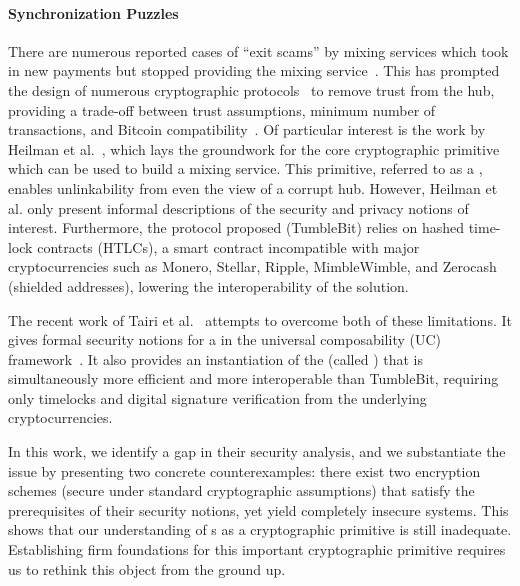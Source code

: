 \paragraph{Synchronization Puzzles} There are numerous reported cases of ``exit scams'' by mixing services which took in new payments but stopped providing the mixing service~\cite{exitscam}. 
This has prompted the design of numerous cryptographic protocols~\cite{FC:BNMCKF14,FCW:ValRow15,coinswap,FCW:HeiBalGol16} to remove trust from the hub, providing a trade-off between trust assumptions, minimum number of transactions, and Bitcoin compatibility~\cite{NDSS:HABSG17}. Of particular interest is the work by Heilman et al.~\cite{NDSS:HABSG17}, which lays the groundwork for the core cryptographic primitive which can be used to build a mixing service. This primitive, referred to as a \emph{\syncpuzzle}, enables unlinkability from even the view of a corrupt hub. However, Heilman et al. only present informal descriptions of the security and privacy notions of interest. Furthermore, the protocol proposed (TumbleBit) relies on hashed time-lock contracts (HTLCs), a smart contract incompatible with major cryptocurrencies such as Monero, Stellar, Ripple, MimbleWimble, and Zerocash (shielded addresses), lowering the interoperability of the solution. 

The recent work of Tairi et al.~\cite{SP:TaiMorMaf21} attempts to overcome both of these limitations. It gives formal security notions for a \syncpuzzle in the universal composability (UC) framework~\cite{JACM:Canetti20}. It also  provides an instantiation of the \syncpuzzle (called \aal) that is simultaneously more efficient and more interoperable than TumbleBit, requiring only timelocks and digital signature verification from the underlying cryptocurrencies. 

In this work, we identify a gap in their security analysis, and we substantiate the issue by presenting two concrete counterexamples: there exist two encryption schemes (secure under standard cryptographic assumptions) that satisfy the prerequisites of their security notions, yet yield completely insecure systems. This shows that our understanding of {\syncpuzzle}s as a cryptographic primitive is still inadequate. Establishing firm foundations for this important cryptographic primitive requires us to rethink this object from the ground up.